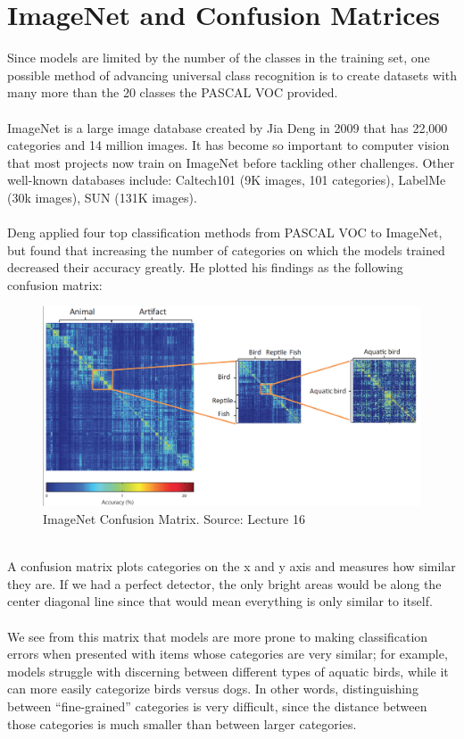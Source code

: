 \documentclass[11pt]{article}
\begin{document}
\section{ImageNet and Confusion Matrices}
Since models are limited by the number of the classes in the training set, one possible method of advancing universal class recognition is to create datasets with many more than the 20 classes the PASCAL VOC provided. \\ \\
ImageNet is a large image database created by Jia Deng in 2009 that  has 22,000 categories and 14 million images. It has become so important to computer vision that most projects now train on ImageNet before tackling other challenges. Other well-known databases include: Caltech101 (9K images, 101 categories), LabelMe (30k images), SUN (131K images).\\ \\
Deng applied four top classification methods from PASCAL VOC to ImageNet, but found that increasing the number of categories on which the models trained decreased their accuracy greatly. He plotted his findings as the following confusion matrix: \\
\begin{figure}[h]
  \centering
  \includegraphics[scale=0.6]{confusionmatrix.png}
  \caption{ImageNet Confusion Matrix. Source: Lecture 16}
\end{figure}\\
A confusion matrix plots categories on the x and y axis and measures how similar they are. If we had a perfect detector, the only bright areas would be along the center diagonal line since that would mean everything is only similar to itself.\\ \\
We see from this matrix that models are more prone to making classification errors when presented with items whose categories are very similar; for example, models struggle with discerning between different types of aquatic birds, while it can more easily categorize birds versus dogs. In other words, distinguishing between ``fine-grained'' categories is very difficult, since the distance between those categories is much smaller than between larger categories.
\end{document}
